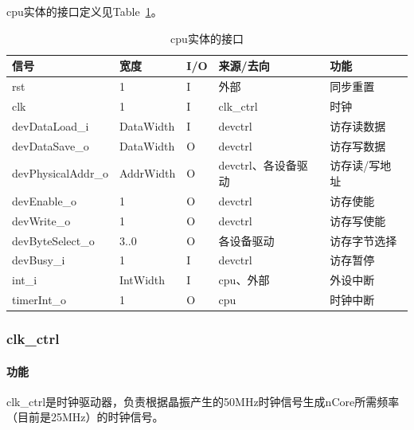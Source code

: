 \documentclass{article}
\begin{document}
\begin{spacing}{1.4}
cpu实体的接口定义见Table~\ref{tb:cpu-interface}。
\begin{table}[!htb]
\begin{center}
\begin{tabular*}{15cm}{l|l|l|l|p{5cm}}
\hline
\textbf{信号}&\textbf{宽度}&\textbf{I/O}&\textbf{来源/去向}&\textbf{功能} \\
\hline rst                     & 1                      & I     & 外部          & 同步重置 \\
\hline clk                     & 1                      & I     & clk\_ctrl     & 时钟 \\
\hline devDataLoad\_i          & DataWidth              & I     & devctrl       & 访存读数据 \\
\hline devDataSave\_o          & DataWidth              & O     & devctrl       & 访存写数据 \\
\hline devPhysicalAddr\_o      & AddrWidth              & O     & devctrl、各设备驱动 & 访存读/写地址 \\
\hline devEnable\_o            & 1                      & O     & devctrl       & 访存使能 \\
\hline devWrite\_o             & 1                      & O     & devctrl       & 访存写使能 \\
\hline devByteSelect\_o        & 3..0                   & O     & 各设备驱动    & 访存字节选择 \\
\hline devBusy\_i              & 1                      & I     & devctrl       & 访存暂停 \\
\hline int\_i                  & IntWidth               & I     & cpu、外部     & 外设中断 \\
\hline timerInt\_o             & 1                      & O     & cpu           & 时钟中断 \\
\hline
\end{tabular*}
\caption{cpu实体的接口}
\label{tb:cpu-interface}
\end{center}
\end{table}

\subsubsection{clk\_ctrl}

\paragraph{功能}\mbox{}

clk\_ctrl是时钟驱动器，负责根据晶振产生的50MHz时钟信号生成nCore所需频率（目前是25MHz）的时钟信号。


\end{spacing}
\end{document}
